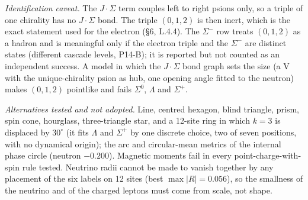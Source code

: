 \documentclass[11pt,letterpaper]{article}
\begin{document}
\noindent \emph{Identification caveat.} The $J\!\cdot\!\Sigma$ term couples left to right psions only, so a triple of one chirality has no $J\!\cdot\!\Sigma$ bond. The triple $(0,1,2)$ is then inert, which is the exact statement used for the electron (\S6, L.4.4). The $\Sigma^-$ row treats $(0,1,2)$ as a hadron and is meaningful only if the electron triple and the $\Sigma^-$ are distinct states (different cascade levels, P14-B); it is reported but not counted as an independent success. A model in which the $J\!\cdot\!\Sigma$ bond graph sets the size (a V with the unique-chirality psion as hub, one opening angle fitted to the neutron) makes $(0,1,2)$ pointlike and fails $\Sigma^0$, $\Lambda$ and $\Sigma^+$.

\noindent \emph{Alternatives tested and not adopted.} Line, centred hexagon, blind triangle, prism, spin cone, hourglass, three-triangle star, and a 12-site ring in which $k=3$ is displaced by $30^\circ$ (it fits $\Lambda$ and $\Sigma^+$ by one discrete choice, two of seven positions, with no dynamical origin); the arc and circular-mean metrics of the internal phase circle (neutron $-0.200$). Magnetic moments fail in every point-charge-with-spin rule tested. Neutrino radii cannot be made to vanish together by any placement of the six labels on 12 sites (best $\max|R|=0.056$), so the smallness of the neutrino and of the charged leptons must come from scale, not shape.
\end{document}
